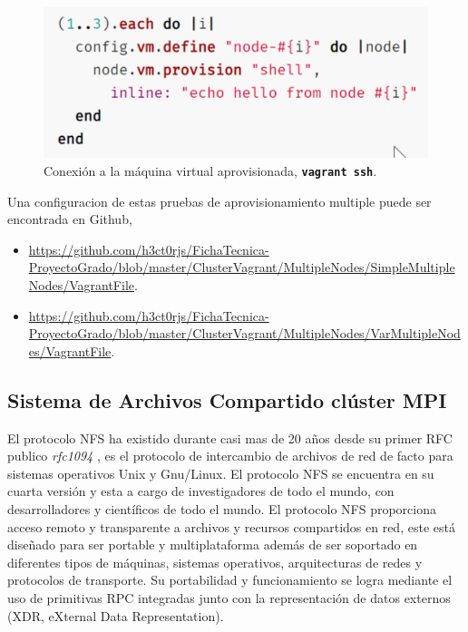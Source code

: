 \documentclass[letterpaper, 12pt, oneside]{article}
\begin{document}
    \begin{figure}[H]
        \includegraphics[scale=0.8]{img/cluster/multi2.png}
        \caption{Conexión a la máquina virtual aprovisionada, \textbf{\texttt{vagrant ssh}}.}
        \label{fig:provision2}
    \end{figure}
    
    Una configuracion de estas pruebas de aprovisionamiento multiple puede ser encontrada en Github,
    \begin{itemize}
        \item \url{https://github.com/h3ct0rjs/FichaTecnica-ProyectoGrado/blob/master/ClusterVagrant/MultipleNodes/SimpleMultipleNodes/VagrantFile}.
        \item \url{https://github.com/h3ct0rjs/FichaTecnica-ProyectoGrado/blob/master/ClusterVagrant/MultipleNodes/VarMultipleNodes/VagrantFile}.
    \end{itemize}
    
    \subsection{Sistema de Archivos Compartido clúster MPI}
    El protocolo NFS ha existido durante casi mas de 20 años desde su primer RFC publico \textit{rfc1094} \cite{nfsv1}, es el protocolo de intercambio de archivos de red de facto para sistemas operativos Unix y Gnu/Linux. El protocolo NFS se encuentra en su cuarta versión y esta a cargo de investigadores de todo el mundo, con desarrolladores y científicos de todo el mundo. El protocolo NFS proporciona acceso remoto y transparente a archivos y recursos compartidos en red, este está diseñado para ser portable y multiplataforma además de ser soportado en diferentes tipos de máquinas, sistemas operativos, arquitecturas de redes y protocolos de transporte. 
    Su portabilidad y funcionamiento se logra mediante el uso de primitivas RPC integradas junto con la representación de datos externos (XDR, eXternal Data Representation). 
    
\end{document}
